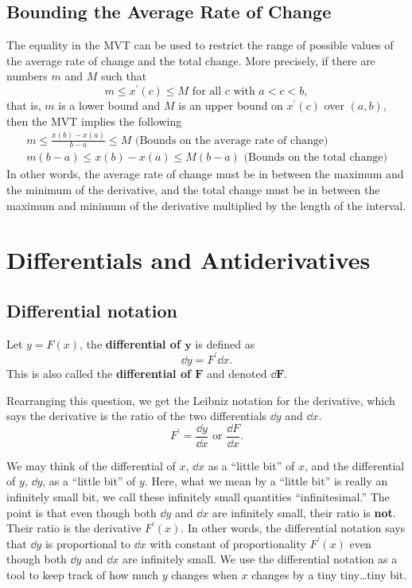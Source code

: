 \subsection{Bounding the Average Rate of Change}
The equality in the MVT can be used to restrict the range of possible values of the average rate of change and the total change. More precisely, if there are numbers $m$ and $M$ such that
\[m\le x^\prime(c)\le M\text{ for all $c$ with }a<c<b,\]
that is, $m$ is a lower bound and $M$ is an upper bound on $x^\prime(c)$ over $(a,b)$, then the MVT implies the following
\begin{gather*}
m\le\frac{x(b)-x(a)}{b-a}\le M\text{ (Bounds on the average rate of change)}\\
m(b-a)\le x(b)-x(a)\le M(b-a)\text{ (Bounds on the total change)}
\end{gather*}
In other words, the average rate of change must be in between the maximum and the minimum of the derivative, and the total change must be in between the maximum and minimum of the derivative multiplied by the length of the interval.
\section{Differentials and Antiderivatives}
\subsection{Differential notation}
Let $y=F(x)$, the \textbf{differential of $\bm{y}$} is defined as
\[\dd y=F^\prime\dd x.\]
This is also called the \textbf{differential of $\bm{F}$} and denoted $\bm{\dd F}$.

\begin{note}
Rearranging this question, we get the Leibniz notation for the derivative, which says the derivative is the ratio of the two differentials $\dd y$ and $\dd x$.
\[F^\prime=\frac{\dd y}{\dd x}\text{ or }\frac{\dd F}{\dd x}.\]
\end{note}

We may think of the differential of $x$, $\dd x$ as a ``little bit'' of $x$, and the differential of $y$, $\dd y$, as a ``little bit'' of $y$. Here, what we mean by a ``little bit'' is really an infinitely small bit, we call these infinitely small quantities ``infinitesimal.'' The point is that even though both $\dd y$ and $\dd x$ are infinitely small, their ratio is \textbf{not}. Their ratio is the derivative $F^\prime(x)$. In other words, the differential notation says that $\dd y$ is proportional to $\dd x$ with constant of proportionality $F^\prime(x)$ even though both $\dd y$ and $\dd x$ are infinitely small. We use the differential notation as a tool to keep track of how much $y$ changes when $x$ changes by a tiny tiny\ldots tiny bit.


